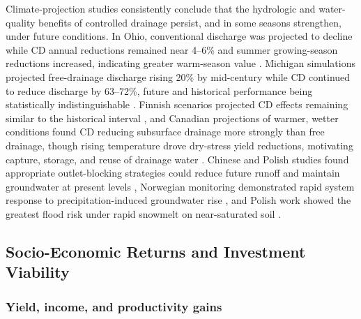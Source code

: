 \documentclass[11pt]{article}
\begin{document}
Climate-projection studies consistently conclude that the hydrologic and
water-quality benefits of controlled drainage persist, and in some seasons
strengthen, under future conditions. In Ohio, conventional discharge was
projected to decline while CD annual reductions remained near 4--6\% and summer
growing-season reductions increased, indicating greater warm-season value
\parencite{Pease2017}. Michigan simulations projected free-drainage discharge
rising 20\% by mid-century while CD continued to reduce discharge by 63--72\%,
future and historical performance being statistically indistinguishable
\parencite{BinShokrana2023}. Finnish scenarios projected CD effects remaining
similar to the historical interval \parencite{Salla2022}, and Canadian projections
of warmer, wetter conditions found CD reducing subsurface drainage more strongly
than free drainage, though rising temperature drove dry-stress yield reductions,
motivating capture, storage, and reuse of drainage water
\parencite{Ndulue2024,Gunn2018}. Chinese and Polish studies found appropriate
outlet-blocking strategies could reduce future runoff and maintain groundwater at
present levels \parencite{Awad2021,Sojka2020}, Norwegian monitoring demonstrated
rapid system response to precipitation-induced groundwater rise
\parencite{Deelstra2015}, and Polish work showed the greatest flood risk under
rapid snowmelt on near-saturated soil \parencite{Szejba2020}.

\subsection{Socio-Economic Returns and Investment Viability}

\subsubsection{Yield, income, and productivity gains}
\end{document}
